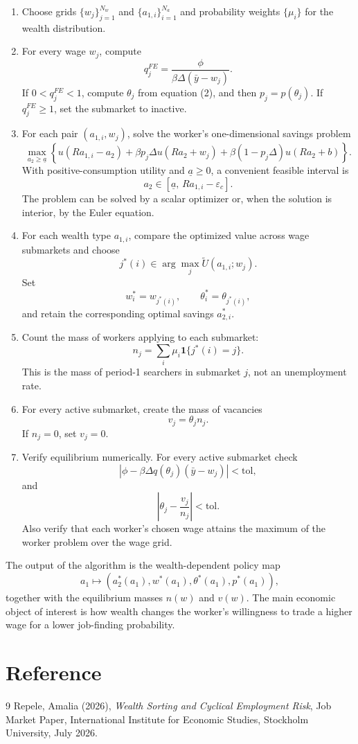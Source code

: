 \documentclass[11pt]{article}
\newcommand{\1}{\mathbf{1}}
\begin{document}
\begin{enumerate}[label=\textbf{Step \arabic*.},leftmargin=*]

\item Choose grids $\{w_j\}_{j=1}^{N_w}$ and $\{a_{1,i}\}_{i=1}^{N_a}$ and probability weights $\{\mu_i\}$ for the wealth distribution.

\item For every wage $w_j$, compute
\[
q_j^{FE}=\frac{\phi}{\beta\Delta(\bar y-w_j)}.
\]
If $0<q_j^{FE}<1$, compute $\theta_j$ from equation (2), and then $p_j=p(\theta_j)$. If $q_j^{FE}\geq 1$, set the submarket to inactive.

\item For each pair $(a_{1,i},w_j)$, solve the worker's one-dimensional savings problem
\[
\max_{a_2\geq \underline a}
\left\{
u(Ra_{1,i}-a_2)
+\beta p_j\Delta u(Ra_2+w_j)
+\beta(1-p_j\Delta)u(Ra_2+b)
\right\}.
\tag{4}
\]
With positive-consumption utility and $\underline a\geq0$, a convenient feasible interval is
\[
a_2\in[\underline a,\,Ra_{1,i}-\varepsilon_c].
\]
The problem can be solved by a scalar optimizer or, when the solution is interior, by the Euler equation.

\item For each wealth type $a_{1,i}$, compare the optimized value across wage submarkets and choose
\[
j^*(i)\in\arg\max_j \widetilde U(a_{1,i};w_j).
\]
Set
\[
w_i^*=w_{j^*(i)}, \qquad \theta_i^*=\theta_{j^*(i)},
\]
and retain the corresponding optimal savings $a_{2,i}^*$.

\item Count the mass of workers applying to each submarket:
\[
n_j=\sum_i \mu_i\1\{j^*(i)=j\}.
\]
This is the mass of period-1 searchers in submarket $j$, not an unemployment rate.

\item For every active submarket, create the mass of vacancies
\[
v_j=\theta_j n_j.
\]
If $n_j=0$, set $v_j=0$.

\item Verify equilibrium numerically. For every active submarket check
\[
\left|\phi-\beta\Delta q(\theta_j)(\bar y-w_j)\right|<\text{tol},
\]
and
\[
\left|\theta_j-\frac{v_j}{n_j}\right|<\text{tol}.
\]
Also verify that each worker's chosen wage attains the maximum of the worker problem over the wage grid.

\end{enumerate}

The output of the algorithm is the wealth-dependent policy map
\[
a_1\mapsto \left(a_2^*(a_1),w^*(a_1),\theta^*(a_1),p^*(a_1)\right),
\]
together with the equilibrium masses $n(w)$ and $v(w)$. The main economic object of interest is how wealth changes the worker's willingness to trade a higher wage for a lower job-finding probability.

\section{Reference}

\begin{thebibliography}{9}
Repele, Amalia (2026), \emph{Wealth Sorting and Cyclical Employment Risk}, Job Market Paper, International Institute for Economic Studies, Stockholm University, July 2026.
\end{thebibliography}
\end{document}

